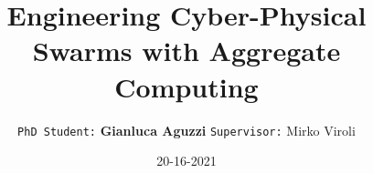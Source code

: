 

\title{
  {\fontfamily{\playfairfamily}\selectfont
  Engineering Cyber-Physical Swarms with Aggregate Computing
  }  
}
\author[G.Aguzzi]{
  \texttt{PhD Student:} \textbf{Gianluca Aguzzi}
  \texttt{Supervisor:} Mirko Viroli
}
\date{ 20-16-2021 }
\talk{ }
